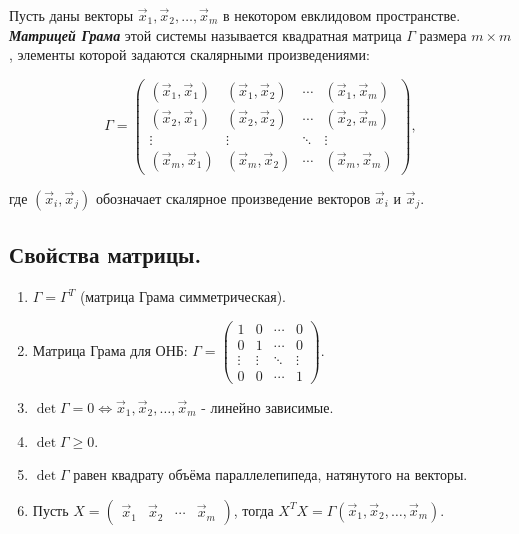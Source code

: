 \begin{definition}
    Пусть даны векторы \( \vec{x}_1, \vec{x}_2, \dots, \vec{x}_m \) в некотором евклидовом пространстве. \textit{\textbf{Матрицей Грама}} этой системы называется квадратная матрица \( \Gamma \) размера \( m \times m \), элементы которой задаются скалярными произведениями:

    \[
    \Gamma = \begin{pmatrix}
    (\vec{x}_1, \vec{x}_1) & (\vec{x}_1, \vec{x}_2) & \cdots & (\vec{x}_1, \vec{x}_m) \\
    (\vec{x}_2, \vec{x}_1) & (\vec{x}_2, \vec{x}_2) & \cdots & (\vec{x}_2, \vec{x}_m) \\
    \vdots     & \vdots     & \ddots & \vdots     \\
    (\vec{x}_m, \vec{x}_1) & (\vec{x}_m, \vec{x}_2) & \cdots & (\vec{x}_m, \vec{x}_m)
    \end{pmatrix},
    \]
    
    где \( (\vec{x}_i, \vec{x}_j) \) обозначает скалярное произведение векторов \( \vec{x}_i \) и \( \vec{x}_j \).
\end{definition}


\subsection*{Свойства матрицы.}

\begin{enumerate}[label={\arabic*°.}]
    \item $\Gamma = \Gamma^T$ (матрица Грама симметрическая).
    \item Матрица Грама для ОНБ: $\Gamma = \begin{pmatrix}
    1 & 0 & \cdots & 0 \\
    0 & 1 & \cdots & 0 \\
    \vdots     & \vdots     & \ddots & \vdots     \\
    0 & 0 & \cdots & 1
    \end{pmatrix}$.

    \item $\det \Gamma = 0 \iff \vec{x}_1, \vec{x}_2, \dots, \vec{x}_m$ - линейно зависимые.
    \item $\det \Gamma \geq 0$.
    \item $\det \Gamma$ равен квадрату объёма параллелепипеда, натянутого на векторы.
    \item Пусть $X = \begin{pmatrix}
    \vec{x}_1 & \vec{x}_2 & \cdots & \vec{x}_m
    \end{pmatrix}$, тогда $X^TX = \Gamma(\vec{x}_1, \vec{x}_2, \ldots, \vec{x}_m).$
\end{enumerate}
